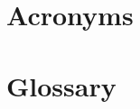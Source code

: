 \chapter{\label{cha:acronyms}Acronyms}
\renewcommand{\glossarysection}[2][]{} %
\printglossary[type=\acronymtype]

\chapter{\label{cha:glossary}Glossary}
\printglossary





